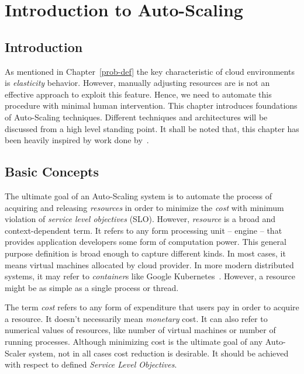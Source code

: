 \chapter{Introduction to Auto-Scaling}
\label{intro-auto-scale}

\section{Introduction}
\label{ias:intro}

As mentioned in Chapter~\ref{prob-def} the key characteristic of cloud environments is \emph{elasticity} behavior. However, manually adjusting resources are is not an effective approach to exploit this feature. Hence, we need to automate this procedure with minimal human intervention. This chapter introduces foundations of Auto-Scaling techniques. Different techniques and architectures will be discussed from a high level standing point. It shall be noted that, this chapter has been heavily inspired by work done by~\textcite{Lorido-Botran2014}.

\section{Basic Concepts}
\label{ias:basics}

The ultimate goal of an Auto-Scaling system is to automate the process of acquiring and releasing \emph{resources} in order to minimize the \emph{cost} with minimum violation of \emph{service level objectives} (SLO). However, \emph{resource} is a broad and context-dependent term. It refers to any form processing unit -- engine -- that provides application developers some form of computation power. This general purpose definition is broad enough to capture different kinds. In most cases, it means virtual machines allocated by cloud provider. In more modern distributed systems, it may refer to \emph{container}s like Google Kubernetes~\cite{kuber}. However, a resource might be as simple as a single process or thread.

The term \emph{cost} refers to any form of expenditure that users pay in order to acquire a resource. It doesn't necessarily mean \emph{monetary} cost. It can also refer to numerical values of resources, like number of virtual machines or number of running processes. Although minimizing cost is the ultimate goal of any Auto-Scaler system, not in all cases cost reduction is desirable. It should be achieved with respect to defined \emph{Service Level Objectives}.


